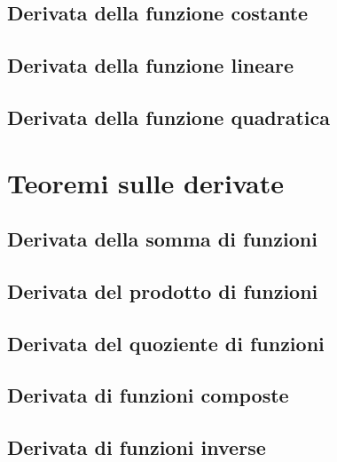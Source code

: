 \subsection{Derivata della funzione costante}
\label{subsec:differenziazione_derivatafcostante}


\newpage
\subsection{Derivata della funzione lineare}
\label{subsec:differenziazione_derivataflineare}

\subsection{Derivata della funzione quadratica}
\label{subsec:differenziazione_derivatafquadratica}

\section{Teoremi sulle derivate}
\label{sec:differenziazione_teoremi}

\subsection{Derivata della somma di funzioni}
\label{subsec:differenziazione_derivatasomma}

\subsection{Derivata del prodotto di funzioni}
\label{subsec:differenziazione_derivataprodotto}

\subsection{Derivata del quoziente di funzioni}
\label{subsec:differenziazione_derivataquoziente}

\subsection{Derivata di funzioni composte}
\label{subsec:differenziazione_derivatacomposte}

\subsection{Derivata di funzioni inverse}
\label{subsec:differenziazione_derivatainverse}


